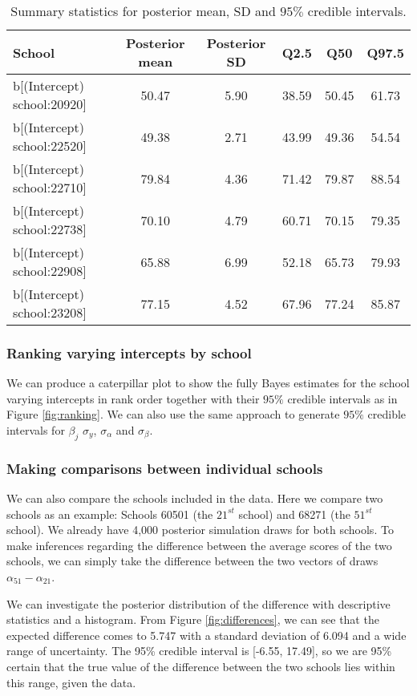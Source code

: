 \begin{table}[ht]
	\centering
	\def\arraystretch{1.3}
	{\small
		\begin{tabular}{l | c c c c c}
			School & Posterior mean & Posterior SD & Q2.5 & Q50 & Q97.5\\
			\hline
			b[(Intercept) school:20920] & 50.47 & 5.90 & 38.59 & 50.45 & 61.73 \\
			b[(Intercept) school:22520] & 49.38 & 2.71 & 43.99 & 49.36 & 54.54 \\
			b[(Intercept) school:22710] & 79.84 & 4.36 &  71.42 & 79.87 & 88.54 \\
			b[(Intercept) school:22738] & 70.10 & 4.79 & 60.71 & 70.15 & 79.35  \\
			b[(Intercept) school:22908] & 65.88 & 6.99 & 52.18 & 65.73 & 79.93 \\
			b[(Intercept) school:23208] &  77.15 & 4.52 & 67.96 & 77.24 & 85.87
		\end{tabular}
	}
	\caption{{\small Summary statistics for posterior mean, SD and $95\%$ credible intervals.}}
	\label{tab:summary_data}
\end{table}

\subsubsection{Ranking varying intercepts by school}

We can produce a caterpillar plot to show the fully Bayes estimates for the school varying intercepts in rank order together with their $95\%$ credible intervals as in Figure \ref{fig:ranking}. We can also use the same approach to generate $95\%$ credible intervals for $\beta_j$ $\sigma_y$, $\sigma_\alpha$ and $\sigma_\beta$.

\subsubsection{Making comparisons between individual schools}

We can also compare the schools included in the data.  Here we compare two schools as an example: Schools 60501 (the $21^{st}$ school) and 68271 (the $51^{st}$ school). We already have 4,000 posterior simulation draws for both schools. To make inferences regarding the difference between the average scores of the two schools, we can simply take the difference between the two vectors of draws $\alpha_{51} - \alpha_{21}$.

We can investigate the posterior distribution of the difference with descriptive statistics and a histogram. From Figure \ref{fig:differences}, we can see that the expected difference comes to 5.747 with a standard deviation of 6.094 and a wide range of uncertainty. The 95\% credible interval is [-6.55, 17.49], so we are 95\% certain that the true value of the difference between the two schools lies within this range, given the data.

